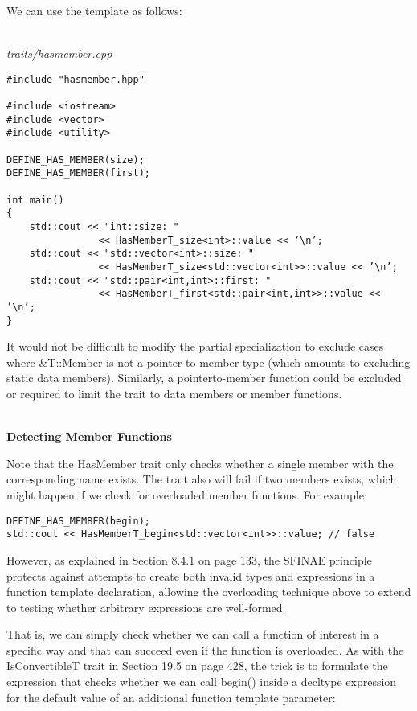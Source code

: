 We can use the template as follows:

\hspace*{\fill} \\ %
\noindent
\textit{traits/hasmember.cpp}
\begin{lstlisting}[style=styleCXX]
#include "hasmember.hpp"

#include <iostream>
#include <vector>
#include <utility>

DEFINE_HAS_MEMBER(size);
DEFINE_HAS_MEMBER(first);

int main()
{
	std::cout << "int::size: "
				<< HasMemberT_size<int>::value << ’\n’;
	std::cout << "std::vector<int>::size: "
				<< HasMemberT_size<std::vector<int>>::value << ’\n’;
	std::cout << "std::pair<int,int>::first: "
				<< HasMemberT_first<std::pair<int,int>>::value << ’\n’;
}
\end{lstlisting}

It would not be difficult to modify the partial specialization to exclude cases where \&T::Member is not a pointer-to-member type (which amounts to excluding static data members). Similarly, a pointerto-member function could be excluded or required to limit the trait to data members or member functions.

\hspace*{\fill} \\ %
\noindent
\textbf{Detecting Member Functions}

Note that the HasMember trait only checks whether a single member with the corresponding name exists. The trait also will fail if two members exists, which might happen if we check for overloaded member functions. For example:

\begin{lstlisting}[style=styleCXX]
DEFINE_HAS_MEMBER(begin);
std::cout << HasMemberT_begin<std::vector<int>>::value; // false
\end{lstlisting}

However, as explained in Section 8.4.1 on page 133, the SFINAE principle protects against attempts to create both invalid types and expressions in a function template declaration, allowing the overloading technique above to extend to testing whether arbitrary expressions are well-formed.

That is, we can simply check whether we can call a function of interest in a specific way and that can succeed even if the function is overloaded. As with the IsConvertibleT trait in Section 19.5 on page 428, the trick is to formulate the expression that checks whether we can call begin() inside a decltype expression for the default value of an additional function template parameter:

